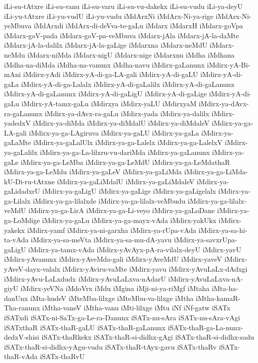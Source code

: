{iLi-su-tAtxre
iLi-su-vanu
iLi-su-varu
iLi-su-vu-dakekx
iLi-su-vudu
iLi-ya-deyU
iLi-yu-tAtxre
iLi-yu-vudU
iLi-yu-vudu
iMdArxNi
iMdArx-Ni-ya-rige
iMdArx-Ni-yeMbuva
iMdArxdi
iMdArx-di-deVva-te-gaLu
iMdarx
iMdarxH
iMdarx-goVpa
iMdarx-goV-pada
iMdarx-goV-pa-veMbuva
iMdarx-jAla
iMdarx-jA-la-daMte
iMdarx-jA-la-dalilx
iMdarx-jA-la-gaLige
iMdarxna
iMdarx-neMdU
iMdarx-neMdu
iMdarx-niMda
iMdarx-nigU
iMdarx-nige
iMdarxnu
iMdha
iMdhana
iMdha-na-diMda
iMdha-na-vanunx
iMdha-navu
iMdirx-gaLanunx
iMdirx-yA-Bi-mAni
iMdirx-yAdi
iMdirx-yA-di-ga-LA-gali
iMdirx-yA-di-gaLU
iMdirx-yA-di-gaLa
iMdirx-yA-di-ga-Lalalx
iMdirx-yA-di-gaLalilx
iMdirx-yA-di-gaLanunx
iMdirx-yA-di-gaLanunx
iMdirx-yA-di-gaLigU
iMdirx-yA-di-gaLige
iMdirx-yA-di-gaLu
iMdirx-yA-tamx-gaLu
iMdirxya
iMdirx-yaLU
iMdirxyaM
iMdirx-ya-dAvx-ra-gaLanunx
iMdirx-ya-dAvx-ra-gaLu
iMdirx-yada
iMdirx-ya-dalilx
iMdirx-yadedxV
iMdirx-ya-diMda
iMdirx-ya-diMdalU
iMdirx-ya-diMdaleV
iMdirx-ya-ga-LA-gali
iMdirx-ya-ga-LAgiruva
iMdirx-ya-gaLU
iMdirx-ya-gaLa
iMdirx-ya-gaLaMte
iMdirx-ya-gaLalUlx
iMdirx-ya-ga-Lalelx
iMdirx-ya-ga-LalelxV
iMdirx-ya-gaLalilx
iMdirx-ya-ga-La-lilxru-vu-dariMda
iMdirx-ya-gaLanunx
iMdirx-ya-gaLe
iMdirx-ya-ga-LeMba
iMdirx-ya-ga-LeMdU
iMdirx-ya-ga-LeMdathaR
iMdirx-ya-ga-LeMdu
iMdirx-ya-gaLeV
iMdirx-ya-gaLiMda
iMdirx-ya-ga-LiMda-kU-Di-ru-tAtxne
iMdirx-ya-gaLiMdalU
iMdirx-ya-gaLiMdaleV
iMdirx-ya-gaLidadxrU
iMdirx-ya-gaLigU
iMdirx-ya-gaLige
iMdirx-ya-gaLigelalx
iMdirx-ya-ga-Lilalx
iMdirx-ya-ga-lilalxde
iMdirx-ya-ga-lilalx-veMbudu
iMdirx-ya-ga-lilalx-veMdU
iMdirx-ya-ga-LirA
iMdirx-ya-ga-Li-veyo
iMdirx-ya-gaLoDane
iMdirx-ya-ga-LoMdige
iMdirx-ya-gaLu
iMdirx-ya-ga-mayx-vAda
iMdirx-yakUkx
iMdirx-yakekx
iMdirx-yamf
iMdirx-ya-ni-garxha
iMdirx-ya-rUpa-vAda
iMdirx-ya-sa-hi-ta-vAda
iMdirx-ya-sa-meVta
iMdirx-ya-sa-mu-dA-yavu
iMdirx-ya-savxrUpa-gaLigU
iMdirx-ya-tamx-vAda
iMdirx-yAvAyx-pA-ra-vilalx-deyU
iMdirx-yavU
iMdirx-yAvanunx
iMdirx-yAveMda-gali
iMdirx-yAveMdU
iMdirx-yaveV
iMdirx-yAveV-dayx-valalx
iMdirx-yAviru-vaMte
iMdirx-yavu
iMdirx-yAvuLaLx-dAdxgi
iMdirx-yAvu-LaLxdudx
iMdirx-yAvuLaLxva-nAdarU
iMdirx-yAvuLaLxva-nA-giyU
iMdirx-yeVNa
iMdoVrx
iMdu
iMgina
iMji-ni-ya-riMgf
iMtaha
iMta-ha-danUnx
iMta-hudeV
iMteMba-lilxge
iMteMbu-va-lilxge
iMtha
iMtha-kamaR-Tha-ranunx
iMtha-vaneV
iMtha-vanu
iMti-lilxge
iMtu
iNf
iNf-gatw
iSATx
iSATxdi
iSATx-ni-SaTx-ga-Le-ra-Danunx
iSATx-nu-sAra
iSATx-nu-sAra-vAgi
iSATxthaR
iSATx-thaR-gaLU
iSATx-thaR-gaLanunx
iSATx-thaR-ga-La-nunx-dedxV-shisi
iSATx-thaRkekx
iSATx-thaR-si-didhx-gAgi
iSATx-thaR-si-didhx-sadu
iSATx-thaR-si-didhx-yAgu-vudu
iSATx-thaR-tAyx-gavu
iSATx-thaRv
iSATx-thaR-vAda
iSATx-thaRvU
}
